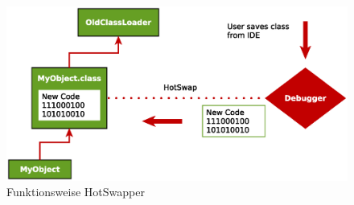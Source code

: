 \begin{figure}[!htb]
\centering
\includegraphics[scale=0.8]{graphics/HotSwapper.eps}
 \caption[Funktionsweise HotSwapper]{Funktionsweise HotSwapper \cite{HotSwapper}}
 \label{Swapper}
\end{figure}